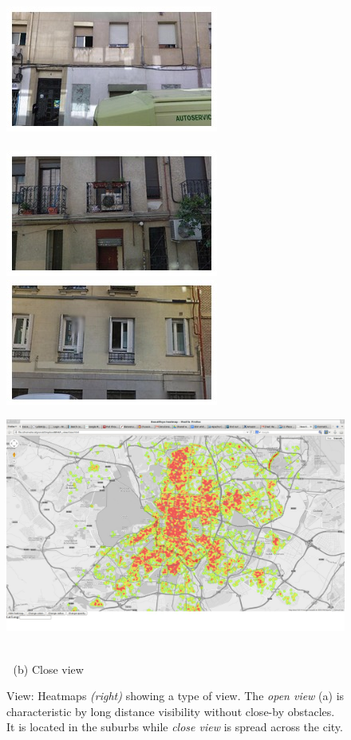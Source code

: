 \begin{figure}
\begin{minipage}{\linewidth}
\begin{minipage}{0.3\linewidth}
      \includegraphics[width=0.49\linewidth]{imgs/view/mosaicsV3/mosaic0007.jpg}
      \\ \vspace{-3mm} \\
      \includegraphics[width=0.49\linewidth]{imgs/view/mosaicsV3/mosaic0008.jpg}
      \includegraphics[width=0.49\linewidth]{imgs/view/mosaicsV3/mosaic0009.jpg}
    \end{minipage}
    \begin{minipage}{0.7\linewidth}
      \includegraphics[trim= 350 150 250 150, clip=true, width=\linewidth]{imgs/view/mapV3.jpg}
    \end{minipage}
  \end{minipage}
  \\
  $\;$\hspace{30mm} (b) Close view
  \\
  \caption{
    View: Heatmaps \emph{(right)} showing a type of view. The \emph{open view} (a) is characteristic by long distance visibility without close-by obstacles. It is located in the suburbs while \emph{close view} is spread across the city.
  }
\end{figure}